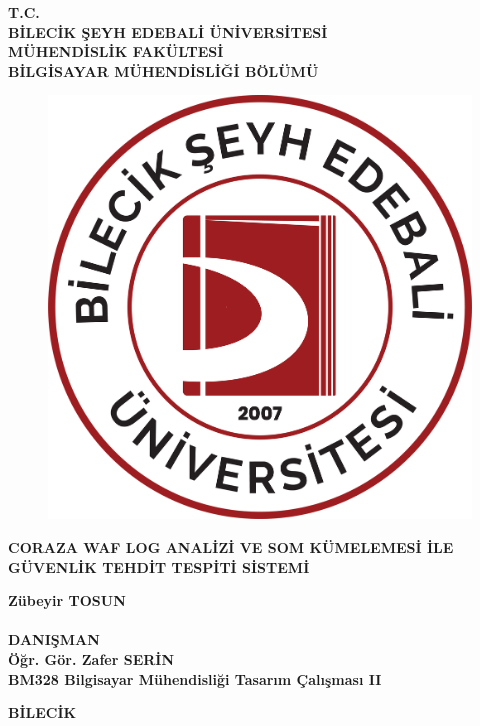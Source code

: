 \thispagestyle{empty}
    \begin{center}

    \textbf{T.C. \\BİLECİK ŞEYH EDEBALİ ÜNİVERSİTESİ \\ MÜHENDİSLİK FAKÜLTESİ \\ BİLGİSAYAR MÜHENDİSLİĞİ BÖLÜMÜ}
    \vspace{.75cm}
    
    \begin{figure}[h!]
    \centering
    \includegraphics[width=0.25\linewidth]{BSEU_LOGO.png}   
    \end{figure}
    
    \vspace{1.25cm}
    
    \textbf{CORAZA WAF LOG ANALİZİ VE SOM KÜMELEMESİ İLE GÜVENLİK TEHDİT TESPİTİ SİSTEMİ }

    \vspace{2cm}
    
    \textbf{Zübeyir TOSUN} \\
    \textbf{} \\ %
    
    \vfill
    \textbf{DANIŞMAN} \\    
    \textbf{Öğr. Gör. Zafer SERİN} \\
    
    \vspace{0.8cm}
    \textbf{BM328 Bilgisayar Mühendisliği Tasarım Çalışması II}
    \vspace{0.8cm}
    
    
    \textbf{BİLECİK \the\year}
    \end{center}
